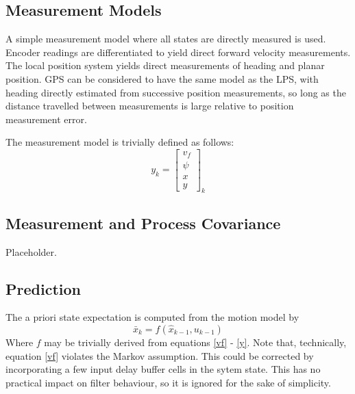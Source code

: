 \documentclass[11pt]{article} %
\begin{document}
\subsection{Measurement Models}

A simple measurement model where all states are directly measured is used.  Encoder readings are differentiated to yield direct forward velocity measurements.
The local position system yields direct measurements of heading and planar position.  
GPS can be considered to have the same model as the LPS, with heading directly estimated from successive position measurements, so long as the distance travelled between measurements is large relative to position measurement error.

The measurement model is trivially defined as follows:
\begin{equation}
y_k = \left[ \begin{array}{c} v_f \\ \psi \\ x \\ y \end{array} \right]_k
\end{equation}

\subsection{Measurement and Process Covariance}

Placeholder.


\subsection{Prediction}

The a priori state expectation is computed from the motion model by
\begin{equation}
\bar{x}_k = f(\hat{x}_{k-1}, u_{k-1})
\end{equation}
Where $f$ may be trivially derived from equations \ref{vf} - \ref{y}.  Note that, technically, equation \ref{vf} violates the Markov assumption.  This could be corrected by incorporating a few input delay buffer cells in the sytem state.  This has no practical impact on filter behaviour, so it is ignored for the sake of simplicity.
\end{document}
